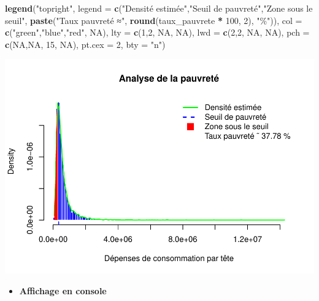 \documentclass[
  12pt,
]{article}
\newenvironment{Shaded}{\begin{snugshade}}{\end{snugshade}}
\newcommand{\AttributeTok}[1]{\textcolor[rgb]{0.13,0.29,0.53}{#1}}
\newcommand{\ConstantTok}[1]{\textcolor[rgb]{0.56,0.35,0.01}{#1}}
\newcommand{\DecValTok}[1]{\textcolor[rgb]{0.00,0.00,0.81}{#1}}
\newcommand{\FunctionTok}[1]{\textcolor[rgb]{0.13,0.29,0.53}{\textbf{#1}}}
\newcommand{\NormalTok}[1]{#1}
\newcommand{\SpecialCharTok}[1]{\textcolor[rgb]{0.81,0.36,0.00}{\textbf{#1}}}
\newcommand{\StringTok}[1]{\textcolor[rgb]{0.31,0.60,0.02}{#1}}
\providecommand{\tightlist}{%
  \setlength{\itemsep}{0pt}\setlength{\parskip}{0pt}}
\begin{document}
\begin{Shaded}
\begin{Highlighting}[]
\FunctionTok{legend}\NormalTok{(}\StringTok{"topright"}\NormalTok{,}
       \AttributeTok{legend =} \FunctionTok{c}\NormalTok{(}\StringTok{"Densité estimée"}\NormalTok{,}\StringTok{"Seuil de pauvreté"}\NormalTok{,}\StringTok{"Zone sous le seuil"}\NormalTok{, }\FunctionTok{paste}\NormalTok{(}\StringTok{"Taux pauvreté ≈"}\NormalTok{, }\FunctionTok{round}\NormalTok{(taux\_pauvrete }\SpecialCharTok{*} \DecValTok{100}\NormalTok{, }\DecValTok{2}\NormalTok{), }\StringTok{"\%"}\NormalTok{)),}
       \AttributeTok{col =} \FunctionTok{c}\NormalTok{(}\StringTok{"green"}\NormalTok{,}\StringTok{"blue"}\NormalTok{,}\StringTok{"red"}\NormalTok{, }\ConstantTok{NA}\NormalTok{),}
       \AttributeTok{lty =} \FunctionTok{c}\NormalTok{(}\DecValTok{1}\NormalTok{,}\DecValTok{2}\NormalTok{, }\ConstantTok{NA}\NormalTok{, }\ConstantTok{NA}\NormalTok{), }\AttributeTok{lwd =} \FunctionTok{c}\NormalTok{(}\DecValTok{2}\NormalTok{,}\DecValTok{2}\NormalTok{, }\ConstantTok{NA}\NormalTok{, }\ConstantTok{NA}\NormalTok{), }\AttributeTok{pch =} \FunctionTok{c}\NormalTok{(}\ConstantTok{NA}\NormalTok{,}\ConstantTok{NA}\NormalTok{, }\DecValTok{15}\NormalTok{, }\ConstantTok{NA}\NormalTok{), }\AttributeTok{pt.cex =} \DecValTok{2}\NormalTok{, }\AttributeTok{bty =} \StringTok{"n"}\NormalTok{)}
\end{Highlighting}
\end{Shaded}

\includegraphics{Stat_non_para_files/figure-latex/unnamed-chunk-179-1.pdf}

\begin{itemize}
\tightlist
\item
  \textbf{Affichage en console}
\end{itemize}
\end{document}

